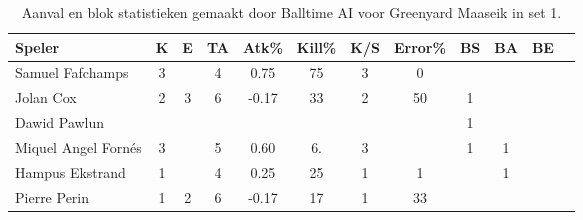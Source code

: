 \begin{table}[ht!]
  \centering
  \scriptsize
  \begin{tabular}{|l|c|c|c|c|c|c|c|c|c|c|c|} \hline
    \textbf{Speler} & K & E & TA & Atk\% & Kill\% & K/S & Error\% & BS & BA & BE \\ \hline
    Samuel Fafchamps & 3 &  & 4 & 0.75 & 75 & 3 & 0 &  &  & \\
    Jolan Cox & 2 & 3 & 6 & -0.17 & 33 & 2 & 50 & 1 &  &  \\
    Dawid Pawlun &   &   &   &   &   &   &   & 1 &  &   \\
    Miquel Angel Fornés & 3 &  & 5 & 0.60 & 6. & 3 &  & 1 & 1 & \\
    Hampus Ekstrand & 1 &  & 4 & 0.25 & 25 & 1 & 1 &  & 1 & \\
    Pierre Perin & 1 & 2 & 6 & -0.17 & 17 & 1 & 33 &  &   &  \\ \hline
    \end{tabular}
  \caption[Aanval en blokstatistieken gemaakt door Balltime AI voor Greenyard Maaseik in set 1]{\label{tab:PL1AttBlockMaaseik1}Aanval en blok statistieken gemaakt door Balltime AI voor Greenyard Maaseik in set 1.}
\end{table}
